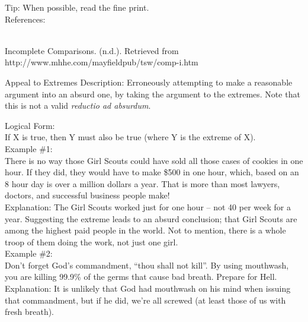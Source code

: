 \documentclass[a4paper,12pt,single,pdftex]{scrbook}
\begin{document}
    
      Tip: When possible, read the fine print.
    \\

    References:

    
      
        
      \\

      
        
          Incomplete Comparisons. (n.d.). Retrieved from http://www.mhhe.com/mayfieldpub/tsw/comp-i.htm
        
      
    
  

Appeal to Extremes
    Description: Erroneously attempting to make a reasonable argument into an absurd one, by taking the argument to the extremes. Note that this is not a valid {\it reductio ad absurdum}.

    
      Logical Form:
    \\

    
      If X is true, then Y must also be true (where Y is the extreme of X).
    \\

    
      Example \#1:
    \\

    
      There is no way those Girl Scouts could have sold all those cases of cookies in one hour.  If they did, they would have to make \$500 in one hour, which, based on an 8 hour day is over a million dollars a year.  That is more than most lawyers, doctors, and successful business people make!
    \\

    
      Explanation: The Girl Scouts worked just for one hour -- not 40 per week for a year.  Suggesting the extreme leads to an absurd conclusion; that Girl Scouts are among the highest paid people in the world.   Not to mention, there is a whole troop of them doing the work, not just one girl.
    \\

    
      Example \#2:
    \\

    
      Don’t forget God’s commandment, “thou shall not kill”.  By using mouthwash, you are killing 99.9\% of the germs that cause bad breath.  Prepare for Hell.
    \\

    
      Explanation: It is unlikely that God had mouthwash on his mind when issuing that commandment, but if he did, we’re all screwed (at least those of us with fresh breath).
    \\
\end{document}
